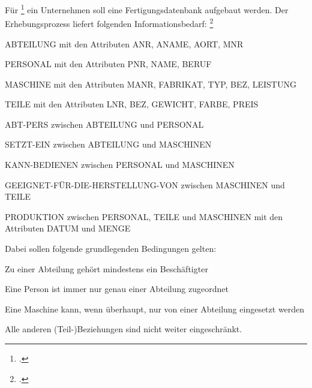 \documentclass{bschlangaul-aufgabe}
\begin{document}

Für \footcite[Aufgabe
3]{examen:66111:1997:09} ein Unternehmen soll eine Fertigungsdatenbank
aufgebaut werden. Der Erhebungsprozess liefert folgenden
Informationsbedarf:
\footcite[Aufgabe 4]{db:ab:7}


\begin{compactitem}
\item ABTEILUNG mit den Attributen ANR, ANAME, AORT, MNR
\item PERSONAL mit den Attributen PNR, NAME, BERUF
\item MASCHINE mit den Attributen MANR, FABRIKAT, TYP, BEZ, LEISTUNG
\item TEILE mit den Attributen LNR, BEZ, GEWICHT, FARBE, PREIS
\end{compactitem}


\begin{compactitem}
\item ABT-PERS zwischen ABTEILUNG und PERSONAL
\item SETZT-EIN zwischen ABTEILUNG und MASCHINEN
\item KANN-BEDIENEN zwischen PERSONAL und MASCHINEN
\item GEEIGNET-FÜR-DIE-HERSTELLUNG-VON zwischen MASCHINEN und TEILE
\item PRODUKTION zwischen PERSONAL, TEILE und MASCHINEN mit den Attributen
DATUM und MENGE
\end{compactitem}

Dabei sollen folgende grundlegenden Bedingungen gelten:

\begin{compactitem}
\item Zu einer Abteilung gehört mindestens ein Beschäftigter

\item Eine Person ist immer nur genau einer Abteilung zugeordnet

\item Eine Maschine kann, wenn überhaupt, nur von einer Abteilung
eingesetzt werden

\item Alle anderen (Teil-)Beziehungen sind nicht weiter eingeschränkt.
\end{compactitem}
\end{document}
